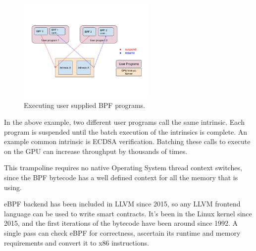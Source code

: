 \documentclass[12pt]{article}
\begin{document}
\begin{figure}
  \begin{center}
    \centering
    \includegraphics[width=0.6\textwidth]{figures/fig_11.png}
    \caption[Fig 11]{Executing user supplied BPF programs.\label{fig_11}}
  \end{center}
  \end{figure}

In the above example, two different user programs call the same intrinsic. Each program is suspended until the batch execution of the intrinsics is complete. An example common intrinsic is ECDSA verification. Batching these calls to execute on the GPU can increase throughput by thousands of times.

This trampoline requires no native Operating System thread context switches, since the BPF bytecode has a well defined context for all the memory that is using.

eBPF backend has been included in LLVM since 2015, so any LLVM frontend language can be used to write smart contracts. It’s been in the Linux kernel since 2015, and the first iterations of the bytecode have been around since 1992. A single pass can check eBPF for correctness, ascertain its runtime and memory requirements and convert it to x86 instructions.



\end{document}
